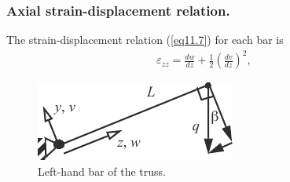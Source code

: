 \documentclass{AeroStructure-ERJohnson}
\begin{document}
\begin{example}
\subsubsection{Axial strain-displacement relation.} The strain-displacement relation (\ref{eq11.7}) for each bar is
\begin{align}
\varepsilon_{z z}=\frac{d w}{d z}+\frac{1}{2}\left(\frac{d v}{d z}\right)^{2}, \label{eq11.3.a}\tag{a}
\end{align}

\vspace*{-1pc}

\begin{figure}
\vspace{-19pt}
\includegraphics{Figure_11-11.pdf}
\caption{Left-hand bar of the truss.\label{fig11.11}}
\end{figure}


\end{example}
\end{document}
